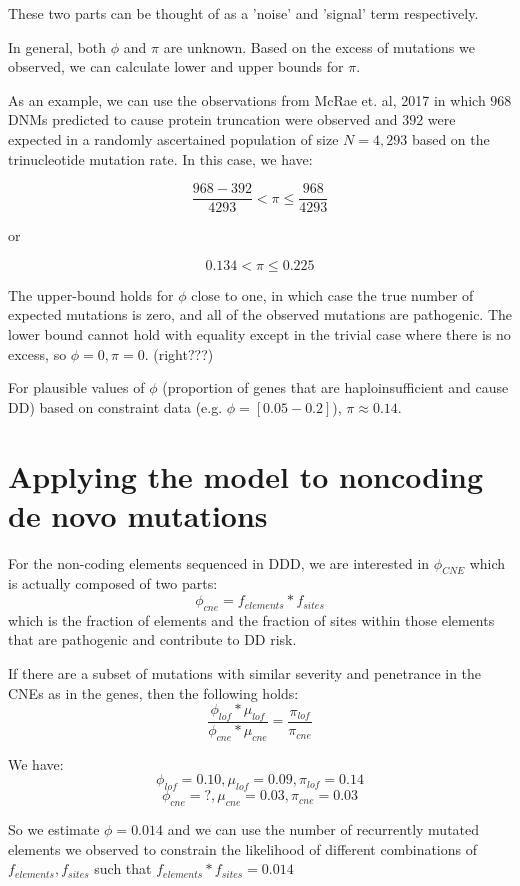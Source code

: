 \documentclass[twoside]{article}
\begin{document}
\normalsize
These two parts can be thought of as a 'noise' and 'signal' term respectively.

In general, both $\phi$ and $\pi$ are unknown. Based on the excess of mutations we observed, we can calculate lower and upper bounds for $\pi$.

As an example, we can use the observations from McRae et. al, 2017 in which $968$ DNMs predicted to cause protein truncation were observed and $392$ were expected in a randomly ascertained population of size $N=4,293$ based on the trinucleotide mutation rate. In this case, we have:

$$ \frac{968-392}{4293} < \pi \leq \frac{968}{4293} $$

or

$$ 0.134 < \pi \leq  0.225 $$

The upper-bound holds for $\phi$ close to one, in which case the true number of expected mutations is zero, and all of the observed mutations are pathogenic. The lower bound cannot hold with equality except in the trivial case where there is no excess, so $\phi = 0, \pi = 0$. (right???)

For plausible values of $\phi$ (proportion of genes that are haploinsufficient and cause DD) based on constraint data (e.g. $\phi = [0.05 - 0.2]$),  $\pi \approx 0.14$.

\section{Applying the model to noncoding de novo mutations}

For the non-coding elements sequenced in DDD, we are interested in $\phi_{CNE}$ which is actually composed of two parts: $$\phi_{cne} = f_{elements} * f_{sites}$$ which is the fraction of elements and the fraction of sites within those elements that are pathogenic and contribute to DD risk.

If there are a subset of mutations with similar severity and penetrance in the CNEs as in the genes, then the following holds:
\[
\frac{\phi_{lof} * \mu_{lof}}{\phi_{cne} * \mu_{cne}} = \frac{\pi_{lof}}{\pi_{cne}} 
\]

We have:
$$\phi_{lof} = 0.10, \mu_{lof} = 0.09, \pi_{lof} = 0.14$$
$$\phi_{cne} = ?, \mu_{cne} = 0.03, \pi_{cne} = 0.03$$

So we estimate $\phi = 0.014$ and we can use the number of recurrently mutated elements we observed to constrain the likelihood of different combinations of $f_{elements}, f_{sites}$ such that $f_{elements} * f_{sites} = 0.014$
\end{document}
